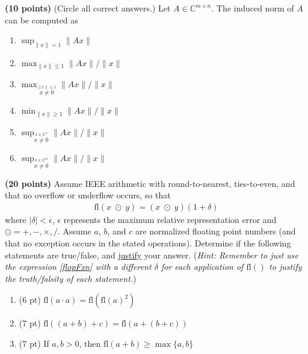 \documentclass{ximera}
\begin{document}
\begin{exercise}
\textbf{(10 points)} (Circle all correct answers.) Let $A \in \mathbb{C}^{m\times n}$. The induced norm of $A$ can be computed as
\begin{enumerate}
    \item $\sup_{\|x\| = 1} \|Ax\|$
    \item $\max_{\|x\| \leq 1} \|Ax\|/\|x\|$
    \item $\max_{\stackrel{\|x\| \leq 1}{x \neq 0}}  \|Ax\|/\|x\|$
    \item $\min_{\|x\| \geq 1} \|Ax\|/\|x\|$
    \item $\sup_{\stackrel{x \in \mathbb{C}^n}{x \neq 0}} \|Ax\|/\|x\|$
    \item $\sup_{\stackrel{x \in \mathbb{C}^m}{x \neq 0}} \|Ax\|/\|x\|$
\end{enumerate}
\end{exercise}

\begin{exercise}
\textbf{(20 points)} Assume IEEE arithmetic with round-to-nearest, ties-to-even, and that no overflow or underflow occurs, so that
\begin{align}\label{flopFxn}
    \text{fl}(x \; \odot\; y) = (x \; \odot\; y)(1+\delta)
\end{align}
where $|\delta| < \epsilon$, $\epsilon$ represents the maximum relative representation error and $\odot = +, - , \times, /$. Assume $a$, $b$, and $c$ are normalized floating point numbers (and that no exception occurs in the stated operations). Determine if the following statements are true/false, and \underline{justify} your answer. (\textit{Hint: Remember to just use the expression \eqref{flopFxn} with a different $\delta$ for each application of $\text{fl}()$ to justify the truth/falsity of each statement.})
\begin{enumerate}
    \item (6 pt) $\text{fl}(a \cdot a) = \text{fl}(\text{fl}(a)^2)$
    \vfill
    \item (7 pt) $\text{fl}((a+b)+c) = \text{fl}(a+(b+c))$
    \vfill
    \item (7 pt) If $a,b>0$, then $\text{fl}({a+b}) \geq \max\{a,b\}$
    \vfill
\end{enumerate}
\end{exercise}
\end{document}
